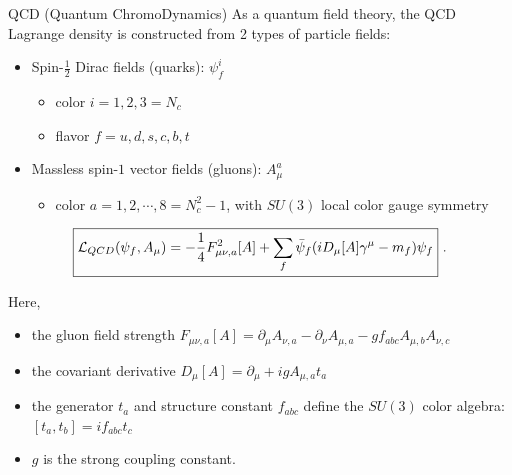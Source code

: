 \documentclass[aspectratio=169, 9pt]{beamer}
\begin{document}
\begin{frame}{QCD (Quantum ChromoDynamics)}
    As a quantum field theory, the QCD Lagrange density is constructed from 2 types of particle fields:
    \begin{itemize}
        \item Spin-$\frac{1}{2}$ Dirac fields (quarks): $\boxed{\psi^{i}_{f}}$
        \begin{itemize}
            \item color $i = 1, 2, 3 =N_{c}$ 
            \item flavor $f=u,d,s,c,b,t$
        \end{itemize}
        \item Massless spin-$1$ vector fields (gluons): $\boxed{A_{\mu}^{a} }$\begin{itemize}
            \item color $a=1,2,\cdots,8=N_{c}^{2}-1$, with $SU(3)$ local color gauge symmetry
        \end{itemize} 
    \end{itemize}
    \begin{align}
        \boxed{\mathcal{L}_{QCD}(\psi_{f},A_{\mu})=-\frac{1}{4}F^{2}_{\mu\nu,a}[A]+\sum_{f}\Bar{\psi}_{f}(iD_{\mu}[A]\gamma^{\mu}-m_{f})\psi_{f}}~.
    \end{align}
    
Here,
\begin{itemize}
\begin{itemize}
    \item the gluon field strength  $\boxed{F_{\mu\nu,a}[A]=\partial_{\mu}A_{\nu,a}-\partial_{\nu}A_{\mu,a}-gf_{abc}A_{\mu,b}A_{\nu,c}}$
    \item the covariant derivative $\boxed{D_{\mu}[A]=\partial_{\mu}+igA_{\mu,a}t_{a}}$
    \item the generator $t_{a}$ and structure constant $f_{abc}$ define the $SU(3)$ color algebra: $\boxed{[t_{a},t_{b}]=if_{abc}t_{c}}$
    \item $g$ is the strong coupling constant.
\end{itemize}
\end{itemize}
\end{frame}
\end{document}
